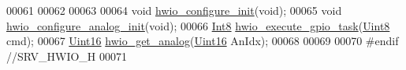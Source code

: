 \begin{DoxyCode}
00061 
00062 
00063 
00064 \textcolor{keywordtype}{void}            \hyperlink{a00058_a46e02bcdf3bfe45545879afb71919d47}{hwio\_configure\_init}(\textcolor{keywordtype}{void});
00065 \textcolor{keywordtype}{void}            \hyperlink{a00058_a33a6b6b17536decccd19c7132479c20b}{hwio\_configure\_analog\_init}(\textcolor{keywordtype}{void});
00066 \hyperlink{a00072_a7e31ca7716b8d85dd473450a5c5e5a97}{Int8}            \hyperlink{a00058_a0af9eae455fbdf4e77def5bfffa109cb}{hwio\_execute\_gpio\_task}(\hyperlink{a00072_af84840501dec18061d18a68c162a8fa2}{Uint8} cmd);
00067 \hyperlink{a00072_a59a9f6be4562c327cbfb4f7e8e18f08b}{Uint16}          \hyperlink{a00058_a5770775aca185380868838e69ec20215}{hwio\_get\_analog}(\hyperlink{a00072_a59a9f6be4562c327cbfb4f7e8e18f08b}{Uint16} AnIdx);
00068 
00069 
00070 \textcolor{preprocessor}{#endif //SRV\_HWIO\_H}
00071 
\end{DoxyCode}
